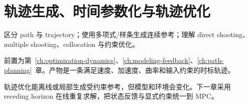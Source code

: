 \chapter{轨迹生成、时间参数化与轨迹优化}
\label{ch:trajectory}

\begin{learningobjectives}
区分 path 与 trajectory；使用多项式/样条生成连续参考；理解 direct shooting、multiple shooting、collocation 与约束优化。
\end{learningobjectives}

\begin{prerequisites}
前置为第~\ref{ch:optimization-dynamics}、\ref{ch:modeling-feedback}、\ref{ch:path-planning}~章。产物是一条满足速度、加速度、曲率和输入约束的时标轨迹。
\end{prerequisites}


\begin{chaptertransition}
轨迹优化能离线或局部生成受约束参考，但模型和环境会变化。下一章采用 receding horizon 在线重复求解，把状态反馈与显式约束统一到 MPC。
\end{chaptertransition}

